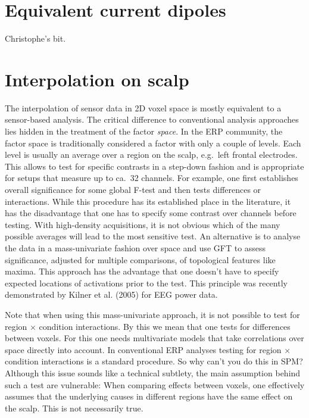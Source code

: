\section{Equivalent current dipoles}
Christophe's bit.

\section{Interpolation on scalp}
The interpolation of sensor data in 2D voxel space is mostly equivalent to
a sensor-based analysis. The critical difference to conventional
analysis approaches lies hidden in the treatment of the factor {\it
space}. In the ERP community, the factor space is traditionally 
considered a factor with only a couple of levels. Each level is
usually an average over a region on the scalp, e.g.~left frontal
electrodes. This allows to test for specific contrasts in a step-down
fashion and is appropriate for setups that measure up to ca.~32
channels. For example, one first establishes overall significance for 
some global F-test and then tests differences or interactions. While
this procedure has its established place in the literature, it has the
disadvantage that one has to specify some contrast over
channels before testing. With high-density acquisitions, it is not
obvious which of the many possible averages will lead to the most
sensitive test. An alternative is to analyse the data in a
mass-univariate fashion over space and use GFT to assess
significance, adjusted for multiple comparisons, of topological
features like maxima. This approach has the advantage that one doesn't
have to specify expected locations of activations prior to the
test. This principle was recently demonstrated by Kilner et al. (2005)
for EEG power data.

Note that when using this mass-univariate approach, it is not possible
to test for region $\times$ condition interactions. By this we mean
that one tests for differences between voxels. For this one needs
multivariate models that take correlations over space directly into
account. In conventional ERP analyses testing for region $\times$
condition interactions is a standard procedure. So why can't you do
this in SPM? Although this issue sounds like a technical subtlety, the
main assumption behind such a test are vulnerable: When comparing
effects between voxels, one effectively assumes that the underlying
causes in different regions have the same effect on the scalp. This is
not necessarily true. 
